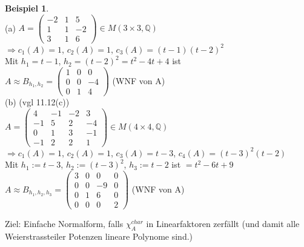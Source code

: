 \documentclass[10pt,a4paper,numbers=endperiod]{scrartcl}
\theoremstyle{definition}
\newtheorem{bsp}[satz]{Beispiel}
\def\QQ{{\mathbb Q}}
\begin{document}
\begin{bsp}
	$ $\\
	(a) $A = \begin{pmatrix}
	-2 & 1 &5\\
	1 & 1 & -2\\
	3 & 1 & 6
	\end{pmatrix} \in M(3 \times 3, \QQ)$\\
	$\Rightarrow c_1(A) = 1$, $c_2(A) = 1$, $c_3(A) = (t-1)(t-2)^2$\\
	Mit $h_1 = t-1$, $h_2 = (t-2)^2 = t^2 -4t +4$ ist\\
	$A \approx B_{h_1, h_2} = \begin{pmatrix}
	1 & 0 & 0\\
	0 & 0 & -4\\
	0 & 1& 4
	\end{pmatrix}$ (WNF von A)\\
	
	(b) (vgl 11.12(c))\\
	$A = \begin{pmatrix}
	4 & -1 & -2 &3\\
	-1 & 5 & 2 & -4\\
	0 & 1 & 3 & -1\\
	-1 & 2 & 2 & 1
	\end{pmatrix} \in M(4 \times 4, \QQ)$\\
	$\Rightarrow c_1(A) = 1$, $c_2(A) = 1$, $c_3(A) = t-3$, $c_4(A) = (t-3)^2(t-2)$\\
	Mit $h_1:= t-3$, $h_2:= (t-3)^2$, $h_3 := t-2$ ist $= t^2 - 6t +9$\\
	$A \approx B_{h_1, h_2, h_3} = \begin{pmatrix}
	3 & 0 & 0 & 0\\
	0 & 0 & -9 & 0\\
	0 & 1 & 6 & 0\\
	0 & 0 & 0 & 2
	\end{pmatrix}$ (WNF von A)
\end{bsp}

Ziel: Einfache Normalform, falls $\chi_A^{char}$ in Linearfaktoren zerfällt (und damit alle Weierstrassteiler Potenzen lineare Polynome sind.)
\end{document}
